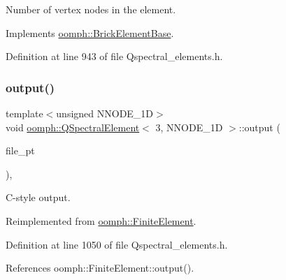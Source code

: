 Number of vertex nodes in the element. 



Implements \hyperlink{classoomph_1_1BrickElementBase_a8a2f954fea0650a9641c69614929cfa7}{oomph\+::\+Brick\+Element\+Base}.



Definition at line 943 of file Qspectral\+\_\+elements.\+h.

\mbox{\label{classoomph_1_1QSpectralElement_3_013_00_01NNODE__1D_01_4_a2d53eb9e8bb0ecf95bcaadfcffdfd6f0}} 
\subsubsection{\texorpdfstring{output()}{output()}\hspace{0.1cm}{\footnotesize\ttfamily [1/4]}}
{\footnotesize\ttfamily template$<$unsigned N\+N\+O\+D\+E\+\_\+1D$>$ \\
void \hyperlink{classoomph_1_1QSpectralElement}{oomph\+::\+Q\+Spectral\+Element}$<$ 3, N\+N\+O\+D\+E\+\_\+1D $>$\+::output (\begin{DoxyParamCaption}\item[{F\+I\+LE $\ast$}]{file\+\_\+pt }\end{DoxyParamCaption})\hspace{0.3cm}{\ttfamily [inline]}, {\ttfamily [virtual]}}



C-\/style output. 



Reimplemented from \hyperlink{classoomph_1_1FiniteElement_a72cddd09f8ddbee1a20a1ff404c6943e}{oomph\+::\+Finite\+Element}.



Definition at line 1050 of file Qspectral\+\_\+elements.\+h.



References oomph\+::\+Finite\+Element\+::output().

\mbox{\label{classoomph_1_1QSpectralElement_3_013_00_01NNODE__1D_01_4_a01295a522815f5dc6c4f26fb8b3257d5}} 
